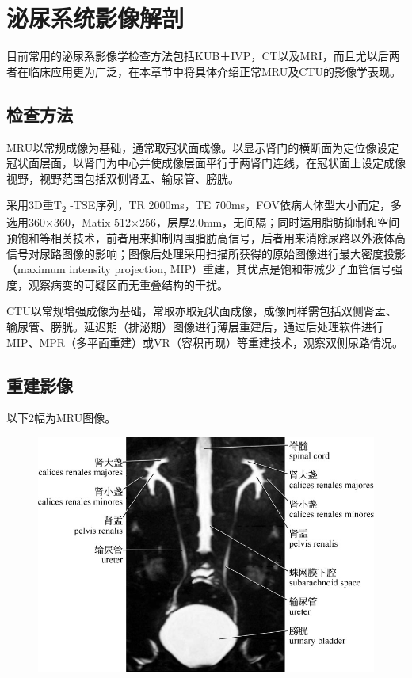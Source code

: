 \chapter{泌尿系统影像解剖}

目前常用的泌尿系影像学检查方法包括KUB＋IVP，CT以及MRI，而且尤以后两者在临床应用更为广泛，在本章节中将具体介绍正常MRU及CTU的影像学表现。

\section{检查方法}

MRU以常规成像为基础，通常取冠状面成像。以显示肾门的横断面为定位像设定冠状面层面，以肾门为中心并使成像层面平行于两肾门连线，在冠状面上设定成像视野，视野范围包括双侧肾盂、输尿管、膀胱。

采用3D重T\textsubscript{2} -TSE序列，TR 2000ms，TE
700ms，FOV依病人体型大小而定，多选用360×360，Matix
512×256，层厚2.0mm，无间隔；同时运用脂肪抑制和空间预饱和等相关技术，前者用来抑制周围脂肪高信号，后者用来消除尿路以外液体高信号对尿路图像的影响；图像后处理采用扫描所获得的原始图像进行最大密度投影（maximum
intensity projection,
MIP）重建，其优点是饱和带减少了血管信号强度，观察病变的可疑区而无重叠结构的干扰。

CTU以常规增强成像为基础，常取亦取冠状面成像，成像同样需包括双侧肾盂、输尿管、膀胱。延迟期（排泌期）图像进行薄层重建后，通过后处理软件进行MIP、MPR（多平面重建）或VR（容积再现）等重建技术，观察双侧尿路情况。

\section{重建影像}

以下2幅为MRU图像。
\begin{figure}[!htbp]
 \centering
 \includegraphics{./images/Image00187.jpg}
  \end{figure} 
 \FloatBarrier

